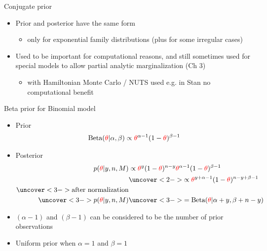 \documentclass[english,t]{beamer}
\begin{document}
\begin{frame}{Conjugate prior}

  \begin{itemize}
  \item Prior and posterior have the same form
    \begin{itemize}
    \item only for exponential family distributions (plus for
      some irregular cases)
    \end{itemize}
  \item Used to be important for computational reasons, and still
    sometimes used for special models to allow partial analytic
    marginalization (Ch 3)
    \begin{itemize}
    \item with Hamiltonian Monte Carlo / NUTS used e.g. in Stan no
      computational benefit
    \end{itemize}
  \end{itemize}
  
\end{frame}

\begin{frame}{Beta prior for Binomial model}

  \begin{itemize}
  \item Prior \baselineskip
    \begin{align*}
      \text{Beta}({\color{red} \theta}|\alpha,\beta) \propto {\color{red} \theta}^{\alpha-1}
      (1-{\color{red} \theta})^{\beta-1}
    \end{align*}
  \item Posterior
    \baselineskip
    \begin{align*}
      p({\color{red} \theta}|y,n,M) & \propto {\color{red} \theta}^y(1-{\color{red} \theta})^{n-y}
                                      {\color{red} \theta}^{\alpha-1} (1-{\color{red} \theta})^{\beta-1}\\
                                    &\uncover<2->{ \propto
                                      {\color{red} \theta}^{y+\alpha-1} (1-{\color{red} \theta})^{n-y+\beta-1}}\\
      \uncover<3->{\text{after normalization}} &\\
      \uncover<3->{p({\color{red} \theta}|y,n,M)}
                                    &\uncover<3->{ = \text{Beta}({\color{red} \theta}|\alpha+y,\beta+n-y)}
    \end{align*}
    \vskip -2mm
  \item<4-> $(\alpha-1)$ and $(\beta-1)$ can be considered to be the
    number of prior observations
  \item<4-> Uniform prior when $\alpha=1$ and $\beta=1$ 
  \end{itemize}
\end{frame}
\end{document}
